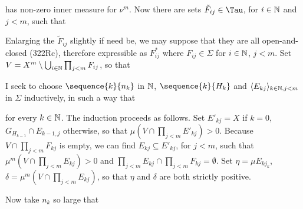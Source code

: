 {

\noindent has non-zero inner measure for $\nu^m$.   Now there are sets
$\tilde F_{ij}\in\Tau$, for $i\in\Bbb N$ and $j<m$, such that


\noindent Enlarging the $\tilde F_{ij}$ slightly if need be, we may
suppose that they are all open-and-closed (322Rc), therefore expressible
as $F_{ij}^*$ where $F_{ij}\in\Sigma$ for $i\in\Bbb N$, $j<m$.
Set $V=X^m\setminus\bigcup_{i\in\Bbb N}\prod_{j<m}F_{ij}$, so that


I seek to choose $\sequence{k}{n_k}$ in $\Bbb N$, $\sequence{k}{H_k}$
and $\langle E_{kj}\rangle_{k\in\Bbb N,j<m}$ in $\Sigma$ inductively, in
such a way that








\noindent for every $k\in\Bbb N$.   The induction proceeds as follows.
Set $E'_{kj}=X$ if $k=0$, $G_{H_{k-1}}\cap E_{k-1,j}$ otherwise, so that
$\mu(V\cap\prod_{j<m}E'_{kj})>0$.   Because $V\cap\prod_{j<m}F_{kj}$ is
empty, we can find $E_{kj}\subseteq E'_{kj}$, for $j<m$, such that
$\mu^m(V\cap\prod_{j<m}E_{kj})>0$ and
$\prod_{j<m}E_{kj}\cap\prod_{j<m}F_{kj}=\emptyset$.   Set
$\eta=\mu E_{kj_k}$, $\delta=\mu^m(V\cap\prod_{j<m}E_{kj})$, so that
$\eta$ and $\delta$ are both strictly positive.

Now take $n_k$ so large that


}
